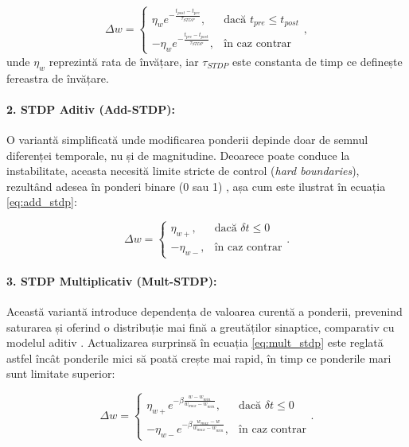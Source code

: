 \begin{equation}
\label{eq:stdp_biologic}
\Delta w = 
\begin{cases} 
\eta_w e^{-\frac{t_{post} - t_{pre}}{\tau_{STDP}}}, & \text{dacă } t_{pre} \leq t_{post} \\
-\eta_w e^{-\frac{t_{pre} - t_{post}}{\tau_{STDP}}}, & \text{în caz contrar}
\end{cases},
\end{equation}
unde $\eta_w$ reprezintă rata de învățare, iar $\tau_{STDP}$ este constanta de timp ce definește fereastra de învățare.

\paragraph{2. STDP Aditiv (Add-STDP):}
O variantă simplificată unde modificarea ponderii depinde doar de semnul diferenței temporale, nu și de magnitudine. Deoarece poate conduce la instabilitate, aceasta necesită limite stricte de control (\textit{hard boundaries}), rezultând adesea în ponderi binare (0 sau 1) \cite{song2000competitive}, așa cum este ilustrat în ecuația \eqref{eq:add_stdp}:

\begin{equation}
\label{eq:add_stdp}
\Delta w = 
\begin{cases} 
\eta_{w+}, & \text{dacă } \delta t \leq 0 \\
-\eta_{w-}, & \text{în caz contrar}
\end{cases}.
\end{equation}

\paragraph{3. STDP Multiplicativ (Mult-STDP):}
Această variantă introduce dependența de valoarea curentă a ponderii, prevenind saturarea și oferind o distribuție mai fină a greutăților sinaptice, comparativ cu modelul aditiv \cite{rossum2000}. Actualizarea surprinsă în ecuația \eqref{eq:mult_stdp} este reglată astfel încât ponderile mici să poată crește mai rapid, în timp ce ponderile mari sunt limitate superior:

\begin{equation}
\label{eq:mult_stdp}
\Delta w = 
\begin{cases} 
\eta_{w+} e^{-\beta \frac{w - w_{min}}{w_{max} - w_{min}}}, & \text{dacă } \delta t \leq 0 \\
-\eta_{w-} e^{-\beta \frac{w_{max} - w}{w_{max} - w_{min}}}, & \text{în caz contrar}
\end{cases}.
\end{equation}

